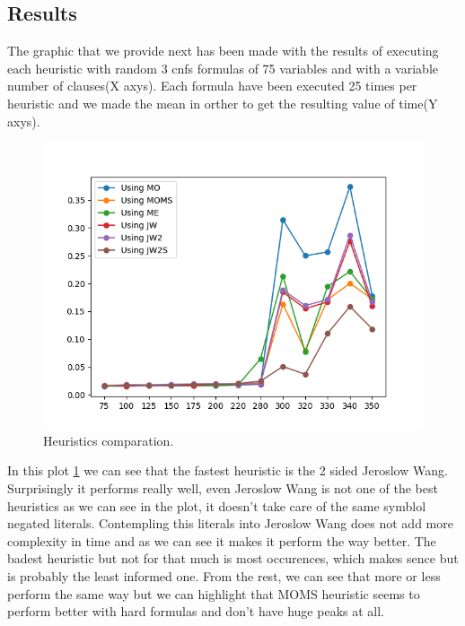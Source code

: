 \documentclass{article}
\begin{document}
\subsection{Results}
The graphic that we provide next has been made with the results of executing each heuristic with random 3 cnfs formulas of 75 variables and with a variable number of clauses(X axys). Each formula have been executed 25 times per heuristic and we made the mean in orther to get the resulting value of time(Y axys).   
\begin{figure}[H]
  \includegraphics[width=\linewidth]{../utils/plots/heuristics.png}
  \caption{Heuristics comparation.}
  \label{fig:heu}
\end{figure}
In this plot \ref{fig:heu} we can see that the fastest heuristic is the 2 sided Jeroslow Wang. Surprisingly it performs really well, even Jeroslow Wang is not one of the best heuristics as we can see in the plot, it doesn't take care of the same symblol negated literals. Contempling this literals into Jeroslow Wang does not add more complexity in time and as we can see it makes it perform the way better.
The badest heuristic but not for that much is most occurences, which makes sence but is probably the least informed one. 
From the rest, we can see that more or less perform the same way but we can highlight that MOMS heuristic seems to perform better with hard formulas and don't have huge peaks at all.
\end{document}
